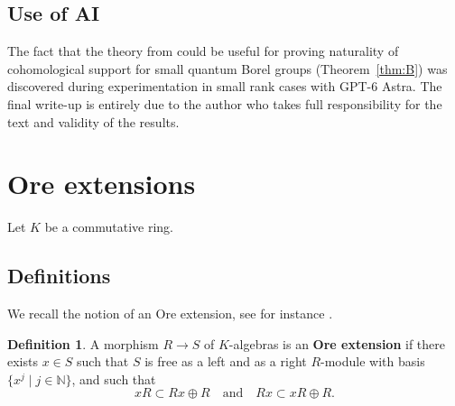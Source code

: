 \documentclass{amsart}
\numberwithin{equation}{section}
\theoremstyle{definition}
\newtheorem{definition}[subsubsection]{Definition}
\theoremstyle{remark}
\newcommand{\mN}{\mathbb{N}}
\begin{document}
\subsection*{Use of AI} The fact that the theory from \cite{NP1, NP2} could be useful for proving naturality of cohomological support for small quantum Borel groups (Theorem~\ref{thm:B}) was discovered during experimentation in small rank cases with GPT-6 Astra. The final write-up is entirely due to the author who takes full responsibility for the text and validity of the results. 


\section{Ore extensions}\label{sec:ore}
Let $K$ be a commutative ring.

\subsection{Definitions}
We recall the notion of an Ore extension, see for instance \cite{GW}.

\begin{definition}
A morphism $R\to S$ of $K$-algebras is an {\bf Ore extension} if there exists $x\in S$ such that $S$ is free as a left and as a right $R$-module with basis $\{x^j\mid j\in\mN\}$, and such that
\[xR\subset Rx\oplus R\quad\mbox{and}\quad Rx\subset xR\oplus R.\]
\end{definition}
\end{document}
